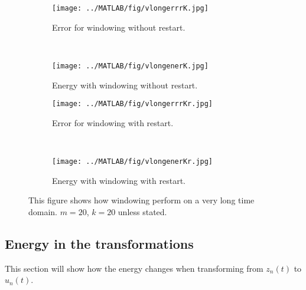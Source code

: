 \begin{figure}[H]
        \centering
		\begin{subfigure}[b]{0.3\textwidth}
                \texttt{[image: ../MATLAB/fig/vlongerrrK.jpg]}
                \caption{ Error for windowing without restart. }
                \label{fig:vlongerrrK}
        \end{subfigure}
        ~
		\begin{subfigure}[b]{0.3\textwidth}
                \texttt{[image: ../MATLAB/fig/vlongenerK.jpg]}
                \caption{ Energy with windowing without restart. }
                \label{fig:vlongenerK}
        \end{subfigure}             
        
        	\begin{subfigure}[b]{0.3\textwidth}
                \texttt{[image: ../MATLAB/fig/vlongerrrKr.jpg]}
                \caption{ Error for windowing with restart. }
                \label{fig:vlongerrrK}
        \end{subfigure}
        ~
		\begin{subfigure}[b]{0.3\textwidth}
                \texttt{[image: ../MATLAB/fig/vlongenerKr.jpg]}
                \caption{ Energy with windowing with restart. }
                \label{fig:vlongenerK}
        \end{subfigure}      
        \caption{  This figure shows how windowing perform on a very long time domain.  $m = 20$, $k = 20$ unless stated. }
        \label{fig:windowingc}
\end{figure}

\subsection{Energy in the transformations}%
\label{sec:transf}
This section will show how the energy changes when transforming from $z_n(t)$ to $u_n(t)$.

